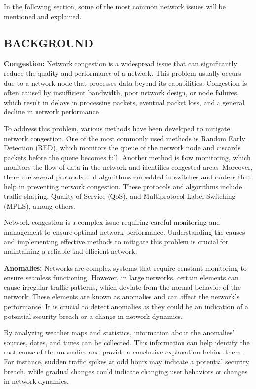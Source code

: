 \documentclass[sigconf,authorversion,nonacm]{acmart}
\begin{document}
In the following section, some of the most common network issues will be mentioned and explained. 
\subsection{BACKGROUND}
\textbf{Congestion:} Network congestion is a widespread issue that can significantly reduce the quality and performance of a network. This problem usually occurs due to a network node that processes data beyond its capabilities. Congestion is often caused by insufficient bandwidth, poor network design, or node failures, which result in delays in processing packets, eventual packet loss, and a general decline in network performance \cite{simulation}.

To address this problem, various methods have been developed to mitigate network congestion. One of the most commonly used methods is Random Early Detection (RED), which monitors the queue of the network node and discards packets before the queue becomes full. Another method is flow monitoring, which monitors the flow of data in the network and identifies congested areas. Moreover, there are several protocols and algorithms embedded in switches and routers that help in preventing network congestion. These protocols and algorithms include traffic shaping, Quality of Service (QoS), and Multiprotocol Label Switching (MPLS), among others.

Network congestion is a complex issue requiring careful monitoring and management to ensure optimal network performance. Understanding the causes and implementing effective methods to mitigate this problem is crucial for maintaining a reliable and efficient network.

\textbf{Anomalies:} Networks are complex systems that require constant monitoring to ensure seamless functioning. However, in large networks, certain elements can cause irregular traffic patterns, which deviate from the normal behavior of the network. These elements are known as anomalies and can affect the network's performance. It is crucial to detect anomalies as they could be an indication of a potential security breach or a change in network dynamics.

By analyzing weather maps and statistics, information about the anomalies' sources, dates, and times can be collected. This information can help identify the root cause of the anomalies and provide a conclusive explanation behind them. For instance, sudden traffic spikes at odd hours may indicate a potential security breach, while gradual changes could indicate changing user behaviors or changes in network dynamics.
\end{document}
